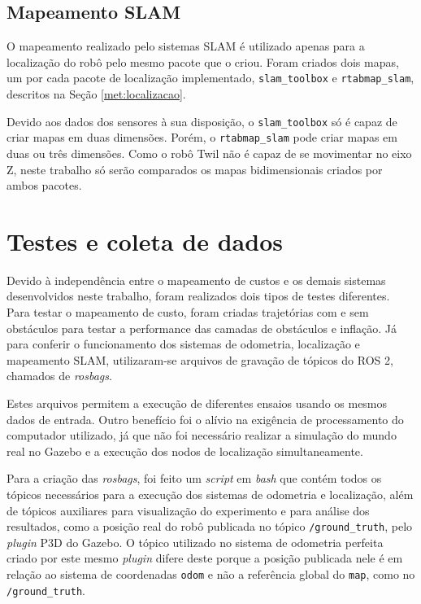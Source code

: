 \documentclass[repeatfields,xlists,xpacks,oneside,yearsonly]{ufrgscca}
\begin{document}

\subsection{Mapeamento SLAM}

O mapeamento realizado pelo sistemas SLAM é utilizado apenas para a
localização do robô pelo mesmo pacote que o criou. Foram criados dois
mapas, um por cada pacote de localização implementado,
\texttt{slam\_toolbox} e \texttt{rtabmap\_slam}, descritos na Seção
\ref{met:localizacao}.

Devido aos dados dos sensores à sua disposição, o
\texttt{slam\_toolbox} só é capaz de criar mapas em duas dimensões.
Porém, o \texttt{rtabmap\_slam} pode criar mapas em duas ou três
dimensões. Como o robô Twil não é capaz de se movimentar no eixo Z,
neste trabalho só serão comparados os mapas bidimensionais criados
por ambos pacotes.


\section{Testes e coleta de dados}
\label{met:testes}

Devido à independência entre o mapeamento de custos e os demais
sistemas desenvolvidos neste trabalho, foram realizados dois tipos de
testes diferentes. Para testar o mapeamento de custo, foram criadas
trajetórias com e sem obstáculos para testar a performance das
camadas de obstáculos e inflação. Já para conferir o funcionamento
dos sistemas de odometria, localização e mapeamento SLAM,
utilizaram-se arquivos de gravação de tópicos do ROS 2, chamados de
\textit{rosbags}.

Estes arquivos permitem a execução de diferentes ensaios usando os
mesmos dados de entrada. Outro benefício foi o alívio na exigência de
processamento do computador utilizado, já que não foi necessário
realizar a simulação do mundo real no Gazebo e a execução dos nodos
de localização simultaneamente.

Para a criação das \textit{rosbags}, foi feito um \textit{script} em
\textit{bash} que contém todos os tópicos necessários para a execução
dos sistemas de odometria e localização, além de tópicos auxiliares
para visualização do experimento e para análise dos resultados, como
a posição real do robô publicada no tópico \texttt{/ground\_truth},
pelo \textit{plugin} P3D do Gazebo. O tópico utilizado no sistema de
odometria perfeita criado por este mesmo \textit{plugin} difere deste
porque a posição publicada nele é em relação ao sistema de
coordenadas \texttt{odom} e não a referência global do \texttt{map},
como no \texttt{/ground\_truth}.
\end{document}
